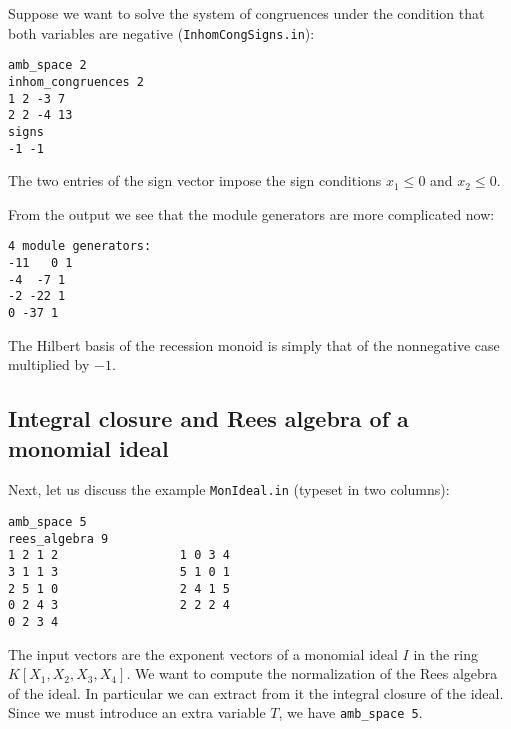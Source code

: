 \documentclass[12pt,a4paper]{scrartcl}
\theoremstyle{definition}
\def\ttt{\texttt}
\begin{document}
Suppose we want to solve the system of congruences under the condition that both variables are negative (\verb|InhomCongSigns.in|): 

\begin{Verbatim}
amb_space 2
inhom_congruences 2
1 2 -3 7
2 2 -4 13
signs
-1 -1
\end{Verbatim}
The two entries of the sign vector impose the sign conditions $x_1\le 0$ and $x_2\le 0$.

From the output we see that the module generators are more complicated now:
\begin{Verbatim}
4 module generators:
-11   0 1
-4  -7 1
-2 -22 1
0 -37 1
\end{Verbatim}
The Hilbert basis of the recession monoid is simply that of the nonnegative case multiplied by $-1$.

\subsection{Integral closure and Rees algebra of a monomial ideal}\label{Rees}

Next, let us discuss the example \ttt{MonIdeal.in} (typeset in two columns):

\begin{Verbatim}
amb_space 5
rees_algebra 9
1 2 1 2                 1 0 3 4
3 1 1 3                 5 1 0 1
2 5 1 0                 2 4 1 5
0 2 4 3                 2 2 2 4
0 2 3 4
\end{Verbatim}
The input vectors are the exponent vectors of a monomial ideal $I$  in the ring $K[X_1,X_2,X_3,X_4]$. We want to compute the normalization of the Rees algebra of the ideal. In particular we can extract from it the integral closure of the ideal. Since we must introduce an extra variable $T$, we have \verb|amb_space 5|.  
\end{document}
